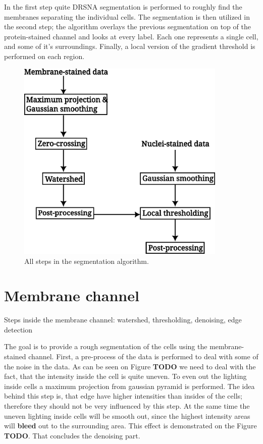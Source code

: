 \documentclass[
  digital,     %
  oneside,     %
  nosansbold,  %
  nocolorbold, %
  lof,         %
  lot,         %
]{fithesis4}
\begin{document}
In the first step quite DRSNA segmentation is performed to roughly find the
membranes separating the individual cells. The segmentation is then utilized in
the second step; the algorithm overlays the previous segmentation on top of the
protein-stained channel and looks at every label. Each one represents a single
cell, and some of it's surroundings. Finally, a local version of the gradient 
threshold is performed on each region.

\begin{figure}
    \begin{center}
        \includegraphics[width=10cm]{./resources/inkscape/segmentation-steps.png}
    \end{center}
    \caption{All steps in the segmentation algorithm.}
    \label{fig:segmentation_steps}
\end{figure}

\section{Membrane channel}
Steps inside the membrane channel: watershed, thresholding, denoising, edge
detection

The goal is to provide a rough segmentation of the cells using the
membrane-stained channel. First, a pre-process of the data is performed to deal
with some of the noise in the data. As can be seen on Figure \textbf{TODO} we
need to deal with the fact, that the intensity inside the cell is quite uneven.
To even out the lighting inside cells a maximum projection from gaussian pyramid
is performed. The idea behind this step is, that edge have higher intensities
than insides of the cells; therefore they should not be very influenced by this
step. At the same time the uneven lighting inside cells will be smooth out,
since the highest intensity areas will \textbf{bleed} out to the surrounding
area. This effect is demonstrated on the Figure \textbf{TODO}. That concludes
the denoising part.
\end{document}
